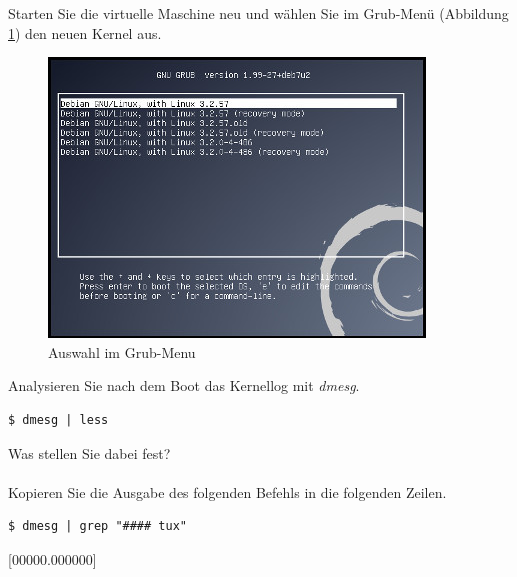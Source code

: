 Starten Sie die virtuelle Maschine neu und wählen Sie im Grub-Menü (Abbildung \ref{boot_grub}) den neuen Kernel aus.
\begin{figure}[h!]
   \begin{center}
      \includegraphics{images/boot_grub}
   \end{center}
   \caption{Auswahl im Grub-Menu}
   \label{boot_grub}
\end{figure}

Analysieren Sie nach dem Boot das Kernellog mit \emph{dmesg}.

\begin{lstlisting}
$ dmesg | less
\end{lstlisting}

Was stellen Sie dabei fest? \\
\underline{\hspace{\textwidth}} \\

Kopieren Sie die Ausgabe des folgenden Befehls in die folgenden Zeilen.
\begin{lstlisting}
$ dmesg | grep "#### tux"
\end{lstlisting}

[00000.000000] \underline{\hspace{0.5\textwidth}} \newline
[00000.000000] \underline{\hspace{0.5\textwidth}} \newline
[00000.000000] \underline{\hspace{0.5\textwidth}} \newline
[00000.000000] \underline{\hspace{0.5\textwidth}} \newline
[00000.000000] \underline{\hspace{0.5\textwidth}} \newline
[00000.000000] \underline{\hspace{0.5\textwidth}} \newline
[00000.000000] \underline{\hspace{0.5\textwidth}} \newline


